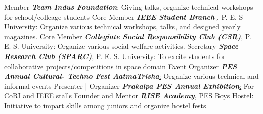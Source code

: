 	\begin{cvskills}
	\cvskill
		{Member}
		{\textit{\textbf{Team Indus Foundation}}: Giving talks, organize technical workshops for school/colleage students}
	\cvskill
		{Core Member}
		{\textit{\textbf{IEEE Student Branch }}\href{http://ieee.pes.edu/}, P. E. S University: Organize various technical workshops, talks, and designed yearly magazines.}
	\cvskill
		{Core Member}
		{\textit{\textbf{Collegiate Social Responsibility Club (CSR)}}\href{http://pes.edu/clubs/pes-csr-club/}, P. E. S. University: Organize various social welfare activities.}
	\cvskill
		{Secretary}
		{\textit{\textbf{Space Research Club (SPARC)}}\href{https://www.facebook.com/Space-Research-Club-Of-PES-University-487153011445398/?tn-str=k*F}, P. E. S. University: To excite students for collaborative projects/competitions in space domain}
	\cvskill
		{Event Organizer}
		{\textit{\textbf{PES Annual Cultural- Techno Fest AatmaTrisha}}\href{http://pes.edu/clubs/atmatrisha/}: Organize various technical and informal events}
	\cvskill
		{Presenter | Organizer}
		{\textit{\textbf{Prakalpa PES Annual Exhibition}}\href{http://pes.edu/clubs/prakalpa/}: For CoRI and IEEE stalls}
	\cvskill
		{Founder and Mentor}
		{\textit{\textbf{RISE Academy}}, PES Boys Hostel: Initiative to impart skills among juniors and organize hostel fests}
\end{cvskills}

